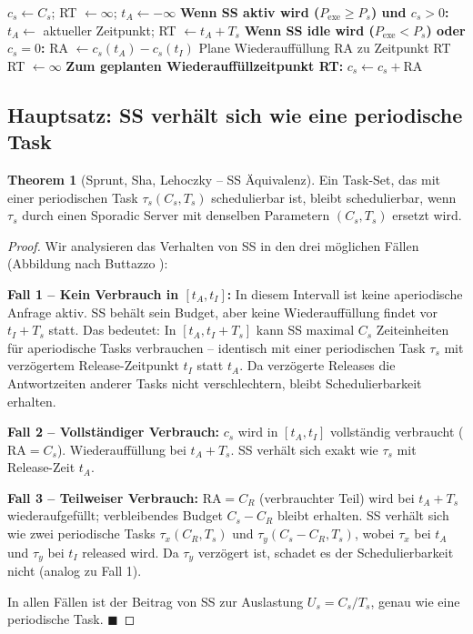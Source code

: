 ﻿\documentclass[a4paper,12pt]{report}
\theoremstyle{definition}
\newtheorem{theorem}{Theorem}[chapter]
\begin{document}
\begin{algorithm}[H]
	\caption{Sporadic Server}
	\begin{algorithmic}[1]
		\State $c_s \leftarrow C_s$; RT $\leftarrow \infty$; $t_A \leftarrow -\infty$
		\State
		\State \textbf{Wenn SS aktiv wird ($P_{\text{exe}} \geq P_s$) und $c_s > 0$:}
		\State $t_A \leftarrow$ aktueller Zeitpunkt; RT $\leftarrow t_A + T_s$
		\EndIf
		\State
		\State \textbf{Wenn SS idle wird ($P_{\text{exe}} < P_s$) oder $c_s = 0$:}
		\State RA $\leftarrow c_s(t_A) - c_s(t_I)$ 
		\State Plane Wiederauffüllung RA zu Zeitpunkt RT
		\State RT $\leftarrow \infty$ 
		\State
		\State \textbf{Zum geplanten Wiederauffüllzeitpunkt RT:}
		\State $c_s \leftarrow c_s + \mathrm{RA}$
	\end{algorithmic}
\end{algorithm}

\subsection{Hauptsatz: SS verhält sich wie eine periodische Task}

\begin{theorem}[Sprunt, Sha, Lehoczky -- SS Äquivalenz]
	\label{thm:ss}
	Ein Task-Set, das mit einer periodischen Task $\tau_s(C_s, T_s)$ schedulierbar
	ist, bleibt schedulierbar, wenn $\tau_s$ durch einen Sporadic Server mit
	denselben Parametern $(C_s, T_s)$ ersetzt wird.
\end{theorem}

\begin{proof}
	Wir analysieren das Verhalten von SS in den drei möglichen Fällen (Abbildung
	nach Buttazzo \cite{Buttazzo2011}):

	\textbf{Fall 1 -- Kein Verbrauch in $[t_A, t_I]$:}
	In diesem Intervall ist keine aperiodische Anfrage aktiv. SS behält sein Budget,
	aber keine Wiederauffüllung findet vor $t_I + T_s$ statt. Das bedeutet: In
	$[t_A, t_I + T_s]$ kann SS maximal $C_s$ Zeiteinheiten für aperiodische Tasks
	verbrauchen -- identisch mit einer periodischen Task $\tau_s$ mit verzögertem
	Release-Zeitpunkt $t_I$ statt $t_A$. Da verzögerte Releases die Antwortzeiten
	anderer Tasks nicht verschlechtern, bleibt Schedulierbarkeit erhalten.

	\textbf{Fall 2 -- Vollständiger Verbrauch:}
	$c_s$ wird in $[t_A, t_I]$ vollständig verbraucht ($\mathrm{RA} = C_s$).
	Wiederauffüllung bei $t_A + T_s$. SS verhält sich exakt wie $\tau_s$ mit
	Release-Zeit $t_A$.

	\textbf{Fall 3 -- Teilweiser Verbrauch:}
	$\mathrm{RA} = C_R$ (verbrauchter Teil) wird bei $t_A + T_s$ wiederaufgefüllt;
	verbleibendes Budget $C_s - C_R$ bleibt erhalten. SS verhält sich wie zwei
	periodische Tasks $\tau_x(C_R, T_s)$ und $\tau_y(C_s - C_R, T_s)$, wobei
	$\tau_x$ bei $t_A$ und $\tau_y$ bei $t_I$ released wird. Da $\tau_y$ verzögert
	ist, schadet es der Schedulierbarkeit nicht (analog zu Fall 1).

	In allen Fällen ist der Beitrag von SS zur Auslastung $U_s = C_s/T_s$, genau
	wie eine periodische Task. \hfill$\blacksquare$
\end{proof}
\end{document}
